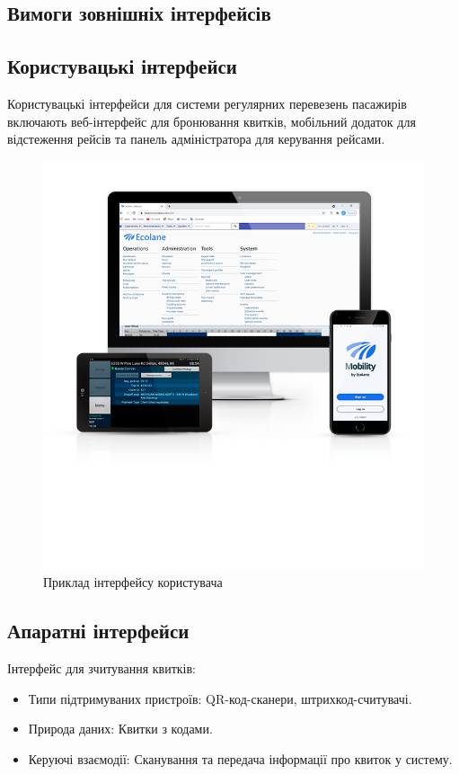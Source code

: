 \documentclass[14pt]{extreport}
\begin{document}
\begin{normalsize}
	\section*{Вимоги зовнішніх інтерфейсів}
	\subsection*{Користувацькі інтерфейси}
	Користувацькі інтерфейси для системи регулярних перевезень пасажирів включають веб-інтерфейс для бронювання квитків, мобільний додаток для відстеження рейсів та панель адміністратора для керування рейсами.
	
	\begin{figure}[H]
		\centering
		\includegraphics[scale=0.65]{1}
		\caption{Приклад інтерфейсу користувача}
	\end{figure}
	
	\subsection*{Апаратні інтерфейси}
	Інтерфейс для зчитування квитків:
	\begin{itemize}
		\item Типи підтримуваних пристроїв: QR-код-сканери, штрихкод-считувачі.
		\item Природа даних: Квитки з кодами.
		\item Керуючі взаємодії: Сканування та передача інформації про квиток у систему.
	\end{itemize}
	

\end{normalsize}
\end{document}
